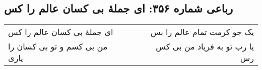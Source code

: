 \begin{center}
\section*{رباعی شماره ۳۵۶: ای جملهٔ بی کسان عالم را کس}
\label{sec:sh356}
\begin{longtable}{l p{0.5cm} r}
ای جملهٔ بی کسان عالم را کس
&&
یک جو کرمت تمام عالم را بس
\\
من بی کسم و تو بی کسان را یاری
&&
یا رب تو به فریاد من بی کس رس
\\
\end{longtable}
\end{center}

